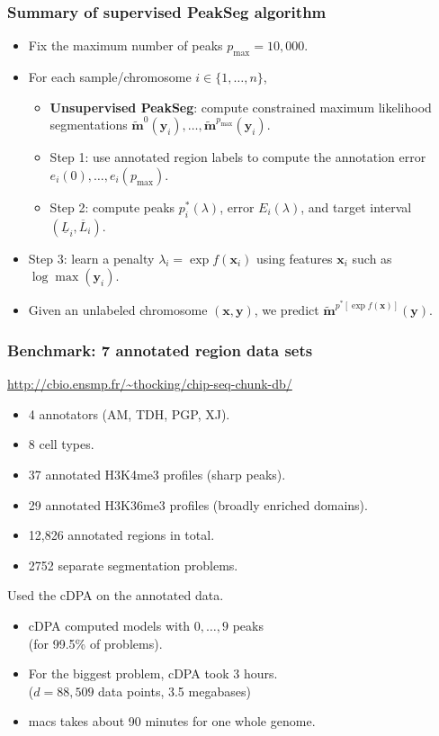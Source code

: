 \documentclass{beamer}
\begin{document}
\begin{frame}
  \frametitle{Summary of supervised PeakSeg 
     algorithm}
  \begin{itemize}
  \item Fix the maximum number of peaks $p_{\text{max}} = 10,000$.
  \item For each sample/chromosome $i\in\{1,\dots, n\}$,
    \begin{itemize}
    \item \textbf{Unsupervised PeakSeg}: compute constrained maximum likelihood
      segmentations $\mathbf{\tilde m}^0(\mathbf y_i), \dots,
      \mathbf{\tilde m}^{p_{\text{max}}}(\mathbf y_i)$.
    \item Step 1: use annotated region labels to compute the
      annotation error $e_i(0), \dots, e_i(p_{\text{max}})$.
    \item Step 2: compute peaks $p_i^*(\lambda)$, error
      $E_i(\lambda)$, and target interval $(\underline L_i, \overline
      L_i)$.
    \end{itemize}
  \item  Step 3:  learn a  penalty $\lambda_i  = \exp  f(\mathbf x_i)$
    using features $\mathbf x_i$ such as $\log \max(\mathbf y_i)$.
  \item Given an unlabeled chromosome $(\mathbf x, \mathbf y)$, we predict
    $\mathbf{ \tilde m}^{p^*\left[
        \exp f(\mathbf x)
      \right]}(\mathbf y)$.
  \end{itemize}
\end{frame}

\begin{frame}
  \frametitle{Benchmark: 7 annotated region data sets}
  \url{http://cbio.ensmp.fr/~thocking/chip-seq-chunk-db/}
  \begin{itemize}
  \item 4 annotators (AM, TDH, PGP, XJ).
  \item 8 cell types.
  \item 37 annotated H3K4me3 profiles (sharp peaks).
  \item 29 annotated H3K36me3 profiles (broadly enriched domains).
  \item 12,826 annotated regions in total.
  \item 2752 separate segmentation problems.
  \end{itemize}
  Used the cDPA on the annotated data.
  \begin{itemize}
  \item cDPA computed models with $0, \dots, 9$ peaks\\
    (for 99.5\% of problems).
  \item For the biggest problem, cDPA took 3 hours.\\
    ($d=88,509$ data points, 3.5 megabases)
  \item macs takes about 90 minutes for one whole genome.
  \end{itemize}
\end{frame}
\end{document}
